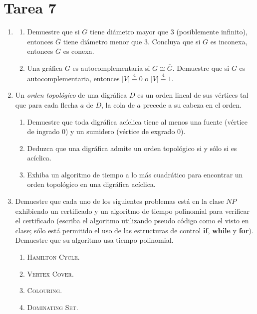 \documentclass{article}
\begin{document}
\section*{\LARGE{Tarea 7}}
\begin{enumerate}
\item \begin{enumerate}
\item Demuestre que si $G$ tiene di\'ametro mayor que $3$ (posiblemente
  infinito), entonces $\overline{G}$ tiene di\'ametro menor que $3$.
  Concluya que si $G$ es inconexa, entonces $\overline{G}$ es conexa.
\item Una gr\'afica $G$ es autocomplementaria si $G \cong \overline{G}$.
  Demuestre que si $G$ es autocomplementaria, entonces $|V|
  \stackrel{4}{\equiv} 0$ o $|V| \stackrel{4}{\equiv} 1$.
\end{enumerate}
\item Un {\em orden topol\'ogico} de una digr\'afica $D$ es un orden lineal de
  sus v\'ertices tal que para cada flecha $a$ de $D$, la cola de $a$ precede a
  su cabeza en el orden.
  \begin{enumerate}
  \item Demuestre que toda digr\'afica ac\'iclica tiene al menos una fuente
    (v\'ertice de ingrado $0$) y un sumidero (v\'ertice de exgrado $0$).
  \item Deduzca que una digr\'afica admite un orden topol\'ogico si y s\'olo
    si es ac\'iclica.
  \item Exhiba un algoritmo de tiempo a lo m\'as cuadr\'atico para encontrar
    un orden topol\'ogico en una digr\'afica ac\'iclica.
  \end{enumerate}
\item Demuestre que cada uno de los siguientes problemas est\'a en la clase
  $NP$ exhibiendo un certificado y un algoritmo de tiempo polinomial para
  verificar el certificado (escriba el algoritmo utilizando pseudo c\'odigo
  como el visto en clase; s\'olo est\'a permitido el uso de las estructuras de
  control {\bf if}, {\bf while} y {\bf for}).   Demuestre que su algoritmo
  usa tiempo polinomial.
  \begin{enumerate}
  \item \textsc{Hamilton Cycle}.
  \item \textsc{Vertex Cover}.
  \item \textsc{Colouring}.
  \item \textsc{Dominating Set}.
  \end{enumerate}
\end{enumerate}
\end{document}

